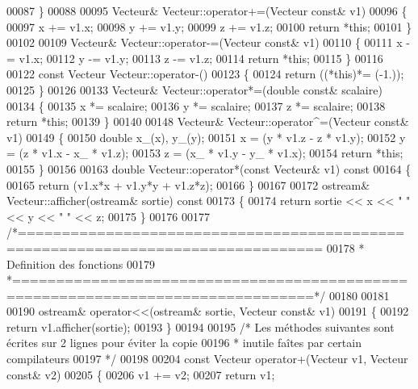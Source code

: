 \begin{DoxyCode}
00087 \}
00088 
00095 Vecteur& Vecteur::operator+=(Vecteur \textcolor{keyword}{const}& v1)
00096 \{
00097     x += v1.x;
00098     y += v1.y;
00099     z += v1.z;
00100     \textcolor{keywordflow}{return} *\textcolor{keyword}{this};
00101 \}
00102 
00109 Vecteur& Vecteur::operator-=(Vecteur \textcolor{keyword}{const}& v1) 
00110 \{
00111     x -= v1.x;
00112     y -= v1.y;
00113     z -= v1.z;
00114     \textcolor{keywordflow}{return} *\textcolor{keyword}{this};
00115 \}
00116 
00122 \textcolor{keyword}{const} Vecteur Vecteur::operator-()
00123 \{
00124     \textcolor{keywordflow}{return} ((*\textcolor{keyword}{this})*= (-1.));
00125 \}
00126 
00133 Vecteur& Vecteur::operator*=(\textcolor{keywordtype}{double} \textcolor{keyword}{const}& scalaire)
00134 \{
00135     x *= scalaire;
00136     y *= scalaire;
00137     z *= scalaire;
00138     \textcolor{keywordflow}{return} *\textcolor{keyword}{this};
00139 \}   
00140 
00148 Vecteur& Vecteur::operator^=(Vecteur \textcolor{keyword}{const}& v1)
00149 \{
00150     \textcolor{keywordtype}{double} x\_(x), y\_(y);
00151     x = (y * v1.z - z * v1.y);
00152     y = (z * v1.x - x\_ * v1.z);
00153     z = (x\_ * v1.y - y\_ * v1.x);
00154     \textcolor{keywordflow}{return} *\textcolor{keyword}{this};
00155 \}
00156 
00163 \textcolor{keywordtype}{double} Vecteur::operator*(\textcolor{keyword}{const} Vecteur& v1)\textcolor{keyword}{ const}
00164 \textcolor{keyword}{}\{
00165     \textcolor{keywordflow}{return} (v1.x*x + v1.y*y + v1.z*z);
00166 \}
00167 
00172 ostream& Vecteur::afficher(ostream& sortie)\textcolor{keyword}{ const}
00173 \textcolor{keyword}{}\{
00174     \textcolor{keywordflow}{return} sortie << x << \textcolor{stringliteral}{" "} << y << \textcolor{stringliteral}{" "} << z;
00175 \}
00176 
00177 \textcolor{comment}{/*================================================================================}
00178 \textcolor{comment}{ * Definition des fonctions }
00179 \textcolor{comment}{ *================================================================================*/}
00180 
00181 
00190 ostream& operator<<(ostream& sortie, Vecteur \textcolor{keyword}{const}& v1)
00191 \{
00192     \textcolor{keywordflow}{return} v1.afficher(sortie);
00193 \}
00194 
00195 \textcolor{comment}{/* Les méthodes suivantes sont écrites sur 2 lignes pour éviter la copie}
00196 \textcolor{comment}{ * inutile faîtes par certain compilateurs }
00197 \textcolor{comment}{ */}
00198 
00204 \textcolor{keyword}{const} Vecteur operator+(Vecteur v1, Vecteur \textcolor{keyword}{const}& v2) 
00205 \{
00206     v1 += v2;
00207     \textcolor{keywordflow}{return} v1;

\end{DoxyCode}
